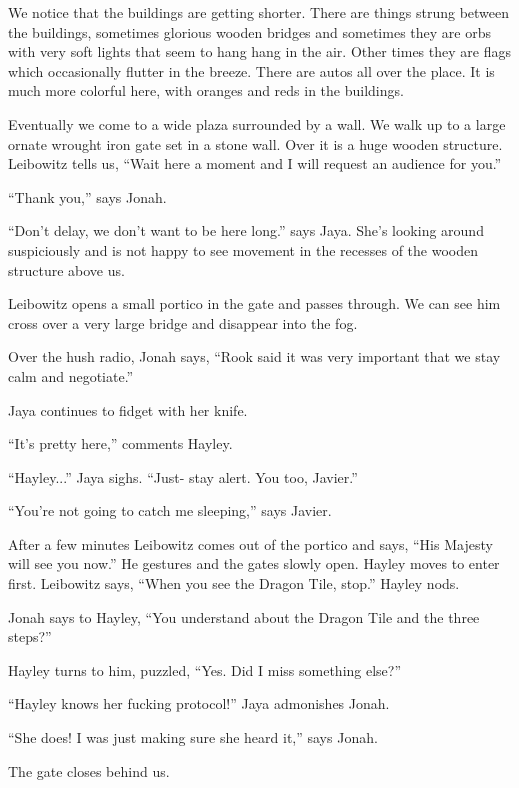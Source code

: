 We notice that the buildings are getting shorter.  There are things strung between the buildings, sometimes glorious wooden bridges and sometimes they are orbs with very soft lights that seem to hang hang in the air.  Other times they are flags which occasionally flutter in the breeze.  There are autos all over the place.  It is much more colorful here, with oranges and reds in the buildings.



Eventually we come to a wide plaza surrounded by a wall.  We walk up to a large ornate wrought iron gate set in a stone wall.  Over it is a huge wooden structure.  Leibowitz tells us, ``Wait here a moment and I will request an audience for you.'' 

``Thank you,'' says Jonah.

``Don't delay, we don't want to be here long.'' says Jaya.  She's looking around suspiciously and is not happy to see movement in the recesses of the wooden structure above us.

Leibowitz opens a small portico in the gate and passes through.  We can see him cross over a very large bridge and disappear into the fog.



Over the hush radio, Jonah says, ``Rook said it was very important that we stay calm and negotiate.''

Jaya continues to fidget with her knife.

``It's pretty here,'' comments Hayley.

``Hayley...'' Jaya sighs.  ``Just- stay alert.  You too, Javier.''

``You're not going to catch me sleeping,'' says Javier.



After a few minutes Leibowitz comes out of the portico and says, ``His Majesty will see you now.''  He gestures and the gates slowly open.  Hayley moves to enter first.  Leibowitz says, ``When you see the Dragon Tile, stop.''  Hayley nods.

Jonah says to Hayley, ``You understand about the Dragon Tile and the three steps?''

Hayley turns to him, puzzled, ``Yes. Did I miss something else?''

``Hayley knows her fucking protocol!'' Jaya admonishes Jonah.

``She does!  I was just making sure she heard it,'' says Jonah.

The gate closes behind us.



